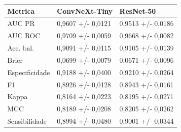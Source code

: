 \begin{tabular}{lll}
\toprule
Metrica & ConvNeXt-Tiny & ResNet-50 \\
\midrule
AUC PR & 0,9607 +/- 0,0121 & 0,9513 +/- 0,0186 \\
AUC ROC & 0,9709 +/- 0,0059 & 0,9668 +/- 0,0082 \\
Acc. bal. & 0,9091 +/- 0,0115 & 0,9105 +/- 0,0139 \\
Brier & 0,0699 +/- 0,0079 & 0,0671 +/- 0,0096 \\
Especificidade & 0,9188 +/- 0,0400 & 0,9210 +/- 0,0264 \\
F1 & 0,8926 +/- 0,0128 & 0,8943 +/- 0,0161 \\
Kappa & 0,8164 +/- 0,0223 & 0,8195 +/- 0,0271 \\
MCC & 0,8189 +/- 0,0208 & 0,8205 +/- 0,0262 \\
Sensibilidade & 0,8994 +/- 0,0480 & 0,9001 +/- 0,0344 \\
\bottomrule
\end{tabular}
